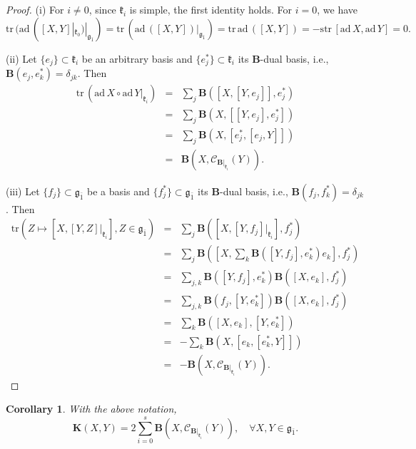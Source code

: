 \documentclass[reqno]{amsart}
\newtheorem{cor}[thm]{Corollary}
\theoremstyle{definition}
\begin{document}
\begin{proof}
(i) For $i\neq 0$,  since $\mathfrak{k}_{i}$  is simple,
the first identity holds.
For $i=0$, we have
\begin{equation*}
\mathrm{tr}\,(\mathrm{ad}\,([X,Y]|_{\mathfrak{k}_{0}})|_{\mathfrak{g}_{\bar{1}}})
=\mathrm{tr}\,(\mathrm{ad}\,([X,Y])|_{\mathfrak{g}_{\bar{1}}})
= \mathrm{tr}\,\mathrm{ad}\,([X,Y])
=-\mathrm{str}\,[\mathrm{ad}\,X,\mathrm{ad}\,Y]
=0.
\end{equation*}


(ii) Let $\{e_{j}\}\subset\mathfrak{k}_{i}$ be an arbitrary basis and $\{e_{j}^{\ast}\}\subset\mathfrak{k}_{i}$ its $\mathbf{B}$-dual basis, i.e., $\mathbf{B}(e_{j},e_{k}^{\ast})=\delta_{jk}$. Then
\begin{eqnarray*}
\mathrm{tr}\,(\mathrm{ad}\,X\circ\mathrm{ad}\,Y|_{\mathfrak{k}_{i}})
&=&\sum\limits_{j}\mathbf{B}([X,[Y,e_{j}]],e_{j}^{\ast})\\
&=&\sum\limits_{j}\mathbf{B}(X,[[Y,e_{j}],e_{j}^{\ast}])\\
&=&\sum\limits_{j}\mathbf{B}(X,[e_{j}^{\ast},[e_{j},Y]])\\
 &=&\mathbf{B}(X,\mathcal{C}_{\mathbf{B}|_{\mathfrak{k}_{i}}}(Y)).
\end{eqnarray*}

(iii) Let $\{f_{j}\}\subset\mathfrak{g}_{\bar{1}}$ be a  basis and $\{f_{j}^{\ast}\}\subset\mathfrak{g}_{\bar{1}}$ its $\mathbf{B}$-dual basis, i.e., $\mathbf{B}(f_{j},f_{k}^{\ast})=\delta_{jk}$. Then
\begin{eqnarray*}
\mathrm{tr}\left(Z\mapsto [X,[Y,Z]|_{\mathfrak{k}_{i}}],Z\in\mathfrak{g}_{\bar{1}}\right)
&=&\sum_{j}\mathbf{B}\left(\left[X,[Y,f_{j}]|_{\mathfrak{k}_{i}}\right],f_{j}^{\ast}\right)\\
&=&\sum_{j}\mathbf{B}\left(\left[X,\sum_{k}\mathbf{B}([Y,f_{j}],e_{k}^{\ast})e_{k}\right],f_{j}^{\ast}\right)\\
&=&\sum_{j,k}\mathbf{B}([Y,f_{j}],e_{k}^{\ast})\mathbf{B}([X,e_{k}],f_{j}^{\ast})\\
&=&\sum_{j,k}\mathbf{B}(f_{j},[Y,e_{k}^{\ast}])\mathbf{B}([X,e_{k}],f_{j}^{\ast})\\
&=&\sum_{k}\mathbf{B}([X,e_{k}],[Y,e_{k}^{\ast}])\\
&=&-\sum_{k}\mathbf{B}(X,[e_{k},[e_{k}^{\ast},Y]])\\
&=&-\mathbf{B}\left(X,\mathcal{C}_{\mathbf{B}|_{\mathfrak{k}_{i}}}(Y)\right).
\end{eqnarray*}
\end{proof}
\begin{cor}\label{3-cor-B=K}
With the above notation,
$$\mathbf{K}(X,Y)=2\sum_{i=0}^{s}\mathbf{B}\left(X,\mathcal{C}_{\mathbf{B}|_{\mathfrak{k}_{i}}}(Y)\right),
\quad \forall X,Y\in \mathfrak{g}_{\bar{1}}.
$$
\end{cor}
\end{document}
